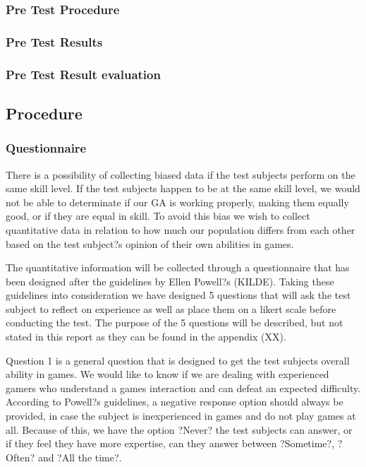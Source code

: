 \subsubsection{Pre Test Procedure}
\subsubsection{Pre Test Results}
\subsubsection{Pre Test Result evaluation}

\subsection{Procedure}

\subsubsection{Questionnaire}
There is a possibility of collecting biased data if the test subjects perform on the same skill level. 
If the test subjects happen to be at the same skill level, we would not be able to determinate if our GA is working properly, making them equally good, or if they are equal in skill. To avoid this bias we wish to collect quantitative data in relation to how much our population differs from each other based on the test subject?s opinion of their own abilities in games. 

The quantitative information will be collected through a questionnaire that has been designed after the guidelines by Ellen Powell?s (KILDE). Taking these guidelines into consideration we have designed 5 questions that will ask the test subject to reflect on experience as well as place them on a likert scale before conducting the test. The purpose of the 5 questions will be described, but not stated in this report as they can be found in the appendix (XX). 

Question 1 is a general question that is designed to get the test subjects overall ability in games. We would like to know if we are dealing with experienced gamers who understand a games interaction and can defeat an expected difficulty. 
According to Powell?s guidelines, a negative response option should always be provided, in case the subject is inexperienced in games and do not play games at all. Because of this, we have the option ?Never? the test subjects can answer, or if they feel they have more expertise, can they answer between ?Sometime?, ?Often? and ?All the time?. 

